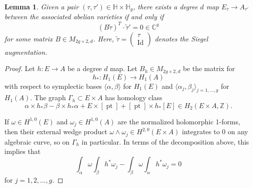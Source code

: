 \documentclass[12pt]{amsart}
\def\bC{\mathbb{C}}
\def\bH{\mathbb{H}}
\def\bZ{\mathbb{Z}}
\DeclareMathOperator{\Id}{Id}
\DeclareMathOperator{\pt}{pt}
\newtheorem{lem}[thm]{Lemma}
\theoremstyle{definition}
\begin{document}
\begin{lem}\label{lem:B_vanishing}
Given a pair $(\tau,\tau')\in \bH\times \bH_g$, there exists a degree $d$ map $E_\tau \to A_{\tau'}$ between the associated abelian varieties if and only if 
\begin{equation*}
    (B \tilde{\tau})^T\cdot \tilde{\tau}'=0\in\bC^g
\end{equation*}
for some matrix $B\in M_{2g\times 2,d}$. Here, $\tilde{\tau} = \begin{pmatrix} \tau \\ \Id \end{pmatrix}$ denotes the Siegel augmentation.
\end{lem}
\begin{proof}
Let $h: E \to A$ be a degree $d$ map. Let $B_h\in M_{2g\times 2,d}$ be the matrix for 
$$h_*:H_1(E) \to H_1(A)$$
with respect to symplectic bases $\langle\alpha,\beta\rangle$ for $H_1(E)$ and $\langle\alpha_j,\beta_j\rangle_{j=1,\ldots,g}$ for $H_1(A)$. The graph $\Gamma_h \subset E \times A$ has homology class
\begin{equation*}
\alpha\times h_*\beta - \beta\times h_*\alpha + E\times [\pt] + [\pt]\times h_*[E]\in H_2(E\times A,\bZ).
\end{equation*}

If $\omega\in H^{1,0}(E)$ and $\omega_j\in H^{1,0}(A)$ are the normalized holomorphic 1-forms, then their external wedge product $\omega \wedge \omega_j\in H^{2,0}(E\times A)$ integrates to 0 on any algebraic curve, so on $\Gamma_h$ in particular. In terms of the decomposition above, this implies that
\begin{equation*}
\int_\alpha \omega \int_\beta h^*\omega_j - \int_\beta \omega \int_\alpha h^*\omega_j=0
\end{equation*}
for $j=1,2,\dots,g$. 


\end{proof}
\end{document}
